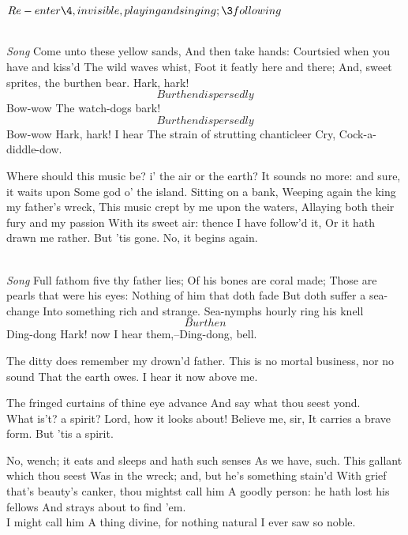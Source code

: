 \documentclass[11pt]{book}
\begin{document}
	\(Re-enter \4, invisible, playing and singing; \3 fol\-low\-ing\)

{\Locus \personae {}
\4 \\
  \Forma{}
  \Locus \textus {+3em}
   \textit{Song}
	Come unto these yellow sands,
	And then take hands:
	Courtsied when you have and kiss'd
	The wild waves whist,
	Foot it featly here and there;
	And, sweet sprites, the burthen bear.
	Hark, hark! 
	\[Burthen dispersedly\]  Bow-wow 
	The watch-dogs bark!
	\[Burthen dispersedly\] Bow-wow 
	Hark, hark! I hear
	The strain of strutting chanticleer
	Cry, Cock-a-diddle-dow.
}


\3	Where should this music be? i' the air or the earth?
	It sounds no more: and sure, it waits upon
	Some god o' the island. Sitting on a bank,
	Weeping again the king my father's wreck,
	This music crept by me upon the waters,
	Allaying both their fury and my passion
	With its sweet air: thence I have follow'd it,
	Or it hath drawn me rather. But 'tis gone.
	No, it begins again.

{\Locus \personae {}
\4 \\
  \Forma{}
  \Locus \textus {+3em}
  \textit{Song}
	Full fathom five thy father lies;
	Of his bones are coral made;
	Those are pearls that were his eyes:
	Nothing of him that doth fade
	But doth suffer a sea-change
	Into something rich and strange.
	Sea-nymphs hourly ring his knell
	\[Burthen\] Ding-dong
	Hark! now I hear them,--Ding-dong, bell.
}

\3	The ditty does remember my drown'd father.
	This is no mortal business, nor no sound
	That the earth owes. I hear it now above me.

\1	The fringed curtains of thine eye advance
	And say what thou seest yond. \\

\2	What is't? a spirit?
	Lord, how it looks about! Believe me, sir,
	It carries a brave form. But 'tis a spirit.

\1	No, wench; it eats and sleeps and hath such senses
	As we have, such. This gallant which thou seest
	Was in the wreck; and, but he's something stain'd
	With grief that's beauty's canker, thou mightst call him
	A goodly person: he hath lost his fellows
	And strays about to find 'em. \\

\2	I might call him
	A thing divine, for nothing natural
	I ever saw so noble. \\
\end{document}
